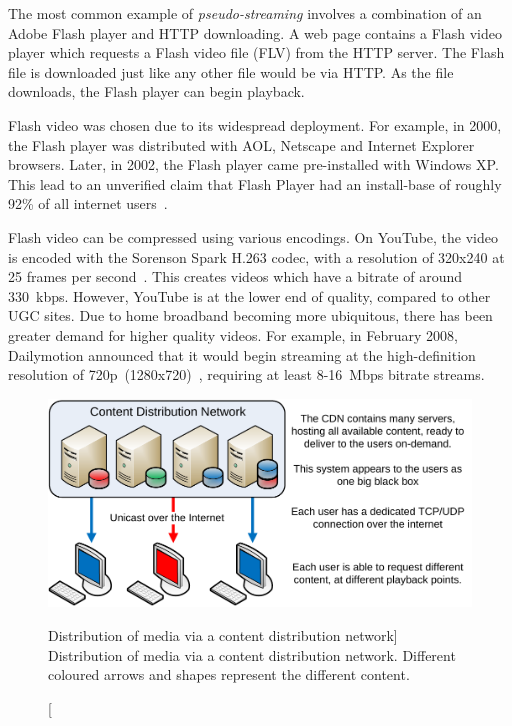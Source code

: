     The most common example of \emph{pseudo-streaming} involves a combination of an Adobe Flash player and HTTP downloading. A web page contains a Flash video player which requests a Flash video file (FLV) from the HTTP server. The Flash file is downloaded just like any other file would be via HTTP. As the file downloads, the Flash player can begin playback.

    Flash video was chosen due to its widespread deployment. For example, in 2000, the Flash player was distributed with AOL, Netscape and Internet Explorer browsers. Later, in 2002, the Flash player came pre-installed with Windows XP. This lead to an unverified claim that Flash Player had an install-base of roughly 92\% of all internet users~\cite{wiki_flash}.

    Flash video can be compressed using various encodings. On YouTube, the video is encoded with the Sorenson Spark H.263 codec, with a resolution of 320x240 at 25 frames per second~\cite{cheng2007uci}. This creates videos which have a bitrate of around 330~kbps. However, YouTube is at the lower end of quality, compared to other UGC sites. Due to home broadband becoming more ubiquitous, there has been greater demand for higher quality videos. For example, in February 2008, Dailymotion announced that it would begin streaming at the high-definition resolution of 720p~(1280x720)~\cite{lowensohn2008dgh}, requiring at least 8-16~Mbps bitrate streams.

\begin{figure}[t]
    \centering

    \includegraphics[width=0.7\columnwidth]{./diagrams/CDN}

    \caption
        [Distribution of media via a content distribution network]
        {Distribution of media via a content distribution network. Different coloured arrows and shapes represent the different content.}
    \label{fig:cdn}
\end{figure}


